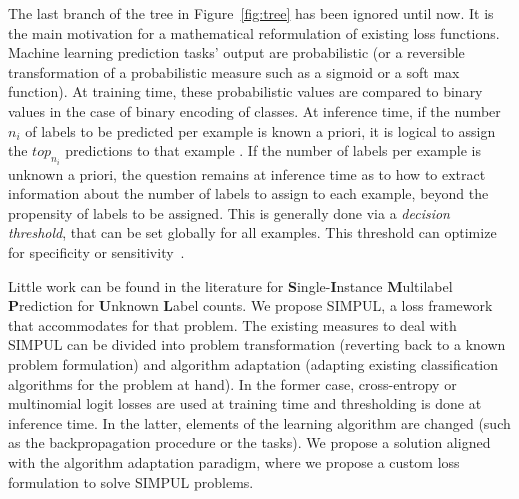 The last branch of the tree in Figure~\ref{fig:tree} has been ignored until now. It is the main motivation for a mathematical reformulation of existing loss functions. Machine learning prediction tasks' output are probabilistic (or a reversible transformation of a probabilistic measure such as a sigmoid or a soft max function). At training time, these probabilistic values are compared to binary values in the case of binary encoding of classes. At inference time, if the number $n_i$ of labels to be predicted per example is known a priori, it is logical to assign the $top_{n_i}$ predictions to that example . If the number of labels per example is unknown a priori, the question remains at inference time as to how to extract information about the number of labels to assign to each example, beyond the propensity of labels to be assigned. This is generally done via a \emph{decision threshold}, that can be set globally for all examples. This threshold can optimize for specificity or sensitivity~\cite{decisionThreshold}.

Little work can be found in the literature for \textbf{S}ingle-\textbf{I}nstance \textbf{M}ultilabel \textbf{P}rediction for \textbf{U}nknown \textbf{L}abel counts. We propose SIMPUL, a loss framework that accommodates for that problem. The existing measures to deal with SIMPUL can be divided into problem transformation (reverting back to a known problem formulation) and algorithm adaptation (adapting existing classification algorithms for the problem at hand). In the former case, cross-entropy or multinomial logit losses are used at training time and thresholding is done at inference time. In the latter, elements of the learning algorithm are changed (such as the backpropagation procedure or the tasks). We propose a solution aligned with the algorithm adaptation paradigm, where we propose a custom loss formulation to solve SIMPUL problems.


